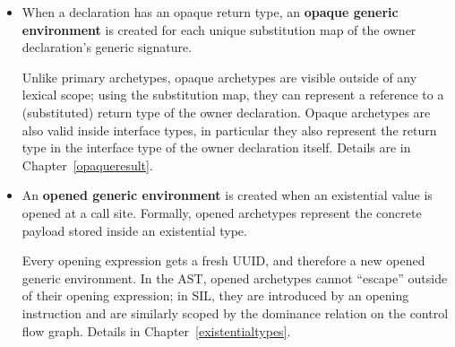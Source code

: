 \documentclass[../generics]{subfiles}
\begin{document}
\begin{itemize}
\item When a declaration has an opaque return type, an \textbf{opaque generic environment} is created for each unique substitution map of the owner declaration's generic signature.
\begin{quote}
\end{quote}
Unlike primary archetypes, opaque archetypes are visible outside of any lexical scope; using the substitution map, they can represent a reference to a (substituted) return type of the owner declaration. Opaque archetypes are also valid inside interface types, in particular they also represent the return type in the interface type of the owner declaration itself. Details are in Chapter~\ref{opaqueresult}.
\item An \textbf{opened generic environment} is created when an existential value is opened at a call site. Formally, opened archetypes represent the concrete payload stored inside an existential type.
\begin{quote}
\end{quote}
Every opening expression gets a fresh UUID, and therefore a new opened generic environment. In the AST, opened archetypes cannot ``escape'' outside of their opening expression; in SIL, they are introduced by an opening instruction and are similarly scoped by the dominance relation on the control flow graph. Details in Chapter~\ref{existentialtypes}.
\end{itemize}
\end{document}
